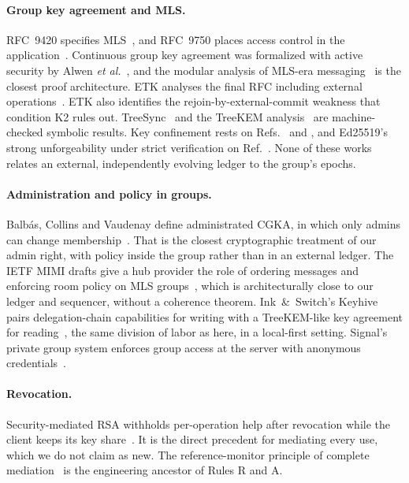 \documentclass[aps,prx,reprint,superscriptaddress,nofootinbib,floatfix]{revtex4-2}
\theoremstyle{remark}
\begin{document}
\paragraph*{Group key agreement and MLS.} RFC~9420 specifies MLS~\cite{rfc9420}, and RFC~9750 places access control in the application~\cite{rfc9750}. Continuous group key agreement was formalized with active security by Alwen \emph{et al.}~\cite{active-cgka}, and the modular analysis of MLS-era messaging~\cite{modular-mls} is the closest proof architecture. ETK analyses the final RFC including external operations~\cite{etk}. ETK also identifies the rejoin-by-external-commit weakness that condition K2 rules out. TreeSync~\cite{treesync} and the TreeKEM analysis~\cite{treekem-fstar} are machine-checked symbolic results. Key confinement rests on Refs.~\cite{treekem-fstar} and \cite{etk}, and Ed25519's strong unforgeability under strict verification on Ref.~\cite{ed25519-provable}. None of these works relates an external, independently evolving ledger to the group's epochs.

\paragraph*{Administration and policy in groups.} Balb\'as, Collins and Vaudenay define administrated CGKA, in which only admins can change membership~\cite{acgka}. That is the closest cryptographic treatment of our admin right, with policy inside the group rather than in an external ledger. The IETF MIMI drafts give a hub provider the role of ordering messages and enforcing room policy on MLS groups~\cite{mimi}, which is architecturally close to our ledger and sequencer, without a coherence theorem. Ink~\&~Switch's Keyhive pairs delegation-chain capabilities for writing with a TreeKEM-like key agreement for reading~\cite{keyhive}, the same division of labor as here, in a local-first setting. Signal's private group system enforces group access at the server with anonymous credentials~\cite{signal-pgs}.

\paragraph*{Revocation.} Security-mediated RSA withholds per-operation help after revocation while the client keeps its key share~\cite{sem}. It is the direct precedent for mediating every use, which we do not claim as new. The reference-monitor principle of complete mediation~\cite{anderson} is the engineering ancestor of Rules R and A.
\end{document}
